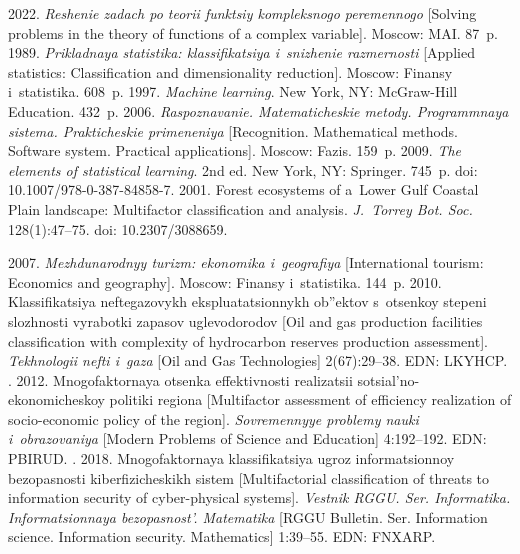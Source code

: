 \begin{multicols}{2}
{{\begin{thebibliography}{99}
 2022. \textit{Reshenie zadach 
po teorii funktsiy kompleksnogo peremennogo} [Solving problems in the theory of 
functions of a complex variable]. Moscow: MAI. 87~p.
 1989. \textit{Prikladnaya statistika: klas\-si\-fi\-ka\-tsiya 
i~snizhenie razmernosti} [Applied statistics: Classification and dimensionality 
reduction]. Moscow: Finansy i~statistika. 608~p.
 1997. \textit{Machine learning}. New York, NY: McGraw-Hill 
Education. 432~p.
 2006. 
\textit{Raspoznavanie. Matematicheskie metody. Programmnaya sistema. 
Prakticheskie primeneniya} [Recognition. Mathematical methods. Software 
system. Practical applications].  Moscow: Fazis. 159~p.
 2009. \textit{The elements of 
statistical learning}. 2nd ed. New York, NY: Springer. 745~p. doi: 
10.1007/978-0-387-84858-7.
 2001. Forest ecosystems of a~Lower Gulf Coastal Plain 
landscape: Multifactor classification and analysis. \textit{J.~Torrey Bot. 
Soc.} 128(1):47--75. doi: 10.2307/3088659.

 2007. \textit{Mezhdunarodnyy turizm: ekonomika 
i~geografiya} [International tourism: Economics and geography]. Moscow: 
Finansy i~statistika. 144~p.
 2010. 
Klassifikatsiya neftegazovykh ekspluatatsionnykh ob''ektov s~otsenkoy stepeni 
slozhnosti vyrabotki zapasov uglevodorodov [Oil and gas production facilities 
classification with complexity of hydrocarbon reserves production assessment]. 
\textit{Tekhnologii nefti i~gaza} [Oil and Gas Technologies] 2(67):29--38. EDN: 
LKYHCP.
. 2012. Mnogofaktornaya 
otsenka effektivnosti realizatsii sotsial'no-ekonomicheskoy politiki regiona 
[Multifactor assessment of efficiency realization of socio-economic policy of the region]. 
\textit{Sovremennyye problemy nauki i~obrazovaniya} [Modern Problems of 
Science and Education] 4:192--192. EDN: \mbox{PBIRUD}.
. 2018. 
Mnogofaktornaya klassifikatsiya ugroz informatsionnoy bezopas\-nosti 
kiberfizicheskikh sistem [Multifactorial classification of threats to information 
security of cyber-physical systems]. \textit{Vestnik RGGU. Ser. Informatika. 
Informatsionnaya bezopasnost'. Matematika} [RGGU Bulletin. Ser. Information 
science. Information security. Mathematics] 1:39--55. EDN: \mbox{FNXARP}.


\end{thebibliography}}}
\end{multicols}
